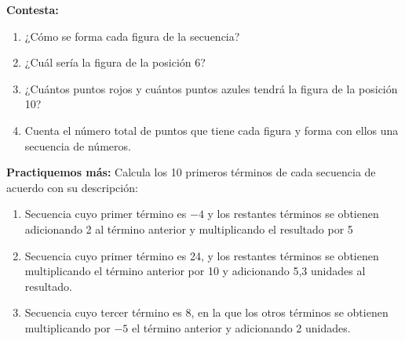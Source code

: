 \documentclass[12pt,a4paper]{article}
\begin{document}
\textbf{Contesta:}
\begin{enumerate}[label=\alph*.]
    \item ¿Cómo se forma cada figura de la secuencia?
    \item ¿Cuál sería la figura de la posición 6?
    \item ¿Cuántos puntos rojos y cuántos puntos azules tendrá la figura de la posición 10?
    \item Cuenta el número total de puntos que tiene cada figura y forma con ellos una secuencia de números.
\end{enumerate}

\vspace{0.5cm}

\textbf{Practiquemos más:} Calcula los 10 primeros términos de cada secuencia de acuerdo con su descripción:

\begin{enumerate}[label=\alph*.]
    \item Secuencia cuyo primer término es $-4$ y los restantes términos se obtienen adicionando 2 al término anterior y multiplicando el resultado por 5

    \item Secuencia cuyo primer término es 24, y los restantes términos se obtienen multiplicando el término anterior por 10 y adicionando 5,3 unidades al resultado.

    \item Secuencia cuyo tercer término es 8, en la que los otros términos se obtienen multiplicando por $-5$ el término anterior y adicionando 2 unidades.
\end{enumerate}

\vspace{1cm}
\end{document}
